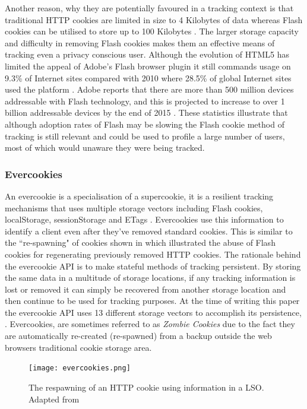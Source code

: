 \documentclass[12pt]{article}
\begin{document}
Another reason, why they are potentially favoured in a tracking context is that traditional HTTP cookies are limited in size to 4 Kilobytes of data whereas Flash cookies can be utilised to store up to 100 Kilobytes \parencite{flashCookies}. The larger storage capacity and difficulty in removing Flash cookies makes them an effective means of tracking even a privacy conscious user. Although the evolution of HTML5 has limited the appeal of Adobe's Flash browser plugin it still commands usage on 9.3\% of Internet sites compared with 2010 where 28.5\% of global Internet sites used the platform \parencite{flashStats}. Adobe reports that there are more than 500 million devices addressable with Flash technology, and this is projected to increase to over 1 billion addressable devices by the end of 2015 \parencite{adobeFlash}. These statistics illustrate that although adoption rates of Flash may be slowing the Flash cookie method of tracking is still relevant and could be used to profile a large number of users, most of which would unaware they were being tracked. 

\subsubsection{Evercookies} \label{evercookies}
An evercookie is a specialisation of a supercookie, it is a resilient tracking mechanisms that uses multiple storage vectors including Flash cookies, localStorage, sessionStorage and ETags \parencite{evercookies}. Evercookies use this information to identify a client even after they've removed standard cookies. This is similar to the ``re-spawning" of cookies shown in \parencite{flashCookiesPrivacy} which illustrated the abuse of Flash cookies for regenerating previously removed HTTP cookies. The rationale behind the evercookie API is to make stateful methods of tracking persistent. By storing the same data in a multitude of storage locations, if any tracking information is lost or removed it can simply be recovered from another storage location and then continue to be used for tracking purposes. At the time of writing this paper the evercookie API uses 13 different storage vectors to accomplish its persistence,  \parencite{evercookies}. Evercookies, are sometimes referred to as \textit{Zombie Cookies} due to the fact they are automatically re-created (re-spawned) from a backup outside the web browsers traditional cookie storage area. \\

\begin{figure}[H]
    \centering
    \texttt{[image: evercookies.png]}
    \caption{The respawning of an HTTP cookie using information in a LSO. Adapted from \parencite{webNeverForgets}}
    \label{fig:evercookies}
\end{figure}
\end{document}
